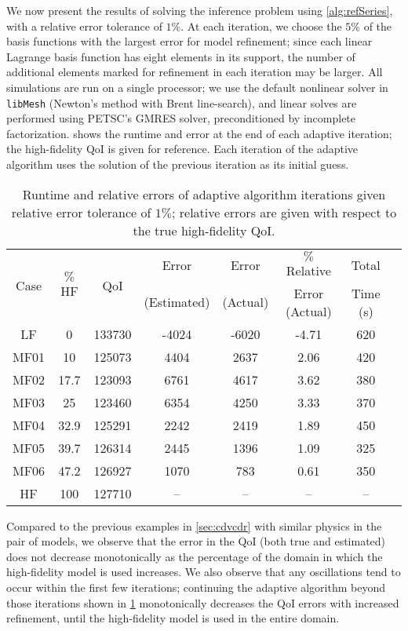 We now present the results of solving the inference problem using \cref{alg:refSeries}, with a relative error tolerance of $1\%$. At each iteration, we choose the $5\%$ of the basis functions with the largest error for model refinement; since each linear Lagrange basis function has eight elements in its support, the number of additional elements marked for refinement in each iteration may be larger. All simulations are run on a single processor; we use the default nonlinear solver in \texttt{libMesh} (Newton's method with Brent line-search), and linear solves are performed using PETSC's GMRES solver, preconditioned by incomplete factorization.  shows the runtime and error at the end of each adaptive iteration; the high-fidelity QoI is given for reference. Each iteration of the adaptive algorithm uses the solution of the previous iteration as its initial guess. 
%
\begin{table}[htbp]
\caption{Runtime and relative errors of adaptive algorithm iterations given relative error tolerance of $1\%$; relative errors are given with respect to the true high-fidelity QoI.}
\label{tab:ref3D}
\centering
\begin{tabular}{|c|c|c|c|c|c|c|c|}
\hline
\multirow{2}{*}{Case} & \multirow{2}{*}{$\%$HF} & \multirow{2}{*}{QoI} & Error & Error & $\%$ Relative & Total \\ 
& & & (Estimated) & (Actual) & Error (Actual) & Time (s) \\ \hline
LF   & 0    & 133730 & -4024 & -6020 & -4.71 & 620 \\
MF01 & 10   & 125073 & 4404  & 2637  & 2.06  & 420 \\
MF02 & 17.7 & 123093 & 6761  & 4617  & 3.62  & 380 \\
MF03 & 25   & 123460 & 6354  & 4250  & 3.33  & 370 \\
MF04 & 32.9 & 125291 & 2242  & 2419  & 1.89  & 450 \\
MF05 & 39.7 & 126314 & 2445  & 1396  & 1.09  & 325 \\
MF06 & 47.2 & 126927 & 1070  & 783   & 0.61  & 350 \\
HF   & 100  & 127710 & --    & --     & --     & -- \\ \hline
\end{tabular}
\end{table}
%

Compared to the previous examples in \cref{sec:cdvcdr} with similar physics in the pair of models, we observe that the error in the QoI (both true and estimated) does not decrease monotonically as the percentage of the domain in which the high-fidelity model is used increases. We also observe that any oscillations tend to occur within the first few iterations; continuing the adaptive algorithm beyond those iterations shown in \cref{tab:ref3D} monotonically decreases the QoI errors with increased refinement, until the high-fidelity model is used in the entire domain.

